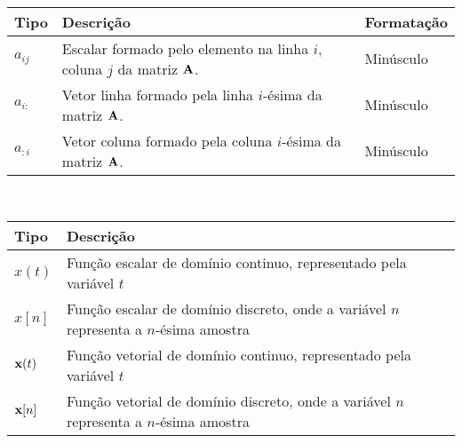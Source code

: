 \begin{notation}~\\
\begin{tabular}{p{} | p{} | p{}}
\hline	
Tipo & Descrição & Formatação \\ \hline
$a_{ij}$ & Escalar formado pelo elemento na linha $i$, coluna $j$ da matriz $\MATRIX{A}$. & Minúsculo \\ \hline
$a_{i:}$ & Vetor linha formado pela linha $i$-ésima da matriz $\MATRIX{A}$.  & Minúsculo \\
$a_{:i}$ & Vetor coluna formado pela coluna $i$-ésima da matriz $\MATRIX{A}$.  & Minúsculo \\
\end{tabular}
\end{notation}


\begin{notation}~\\
\begin{tabular}{p{} | p{} }
\hline	
Tipo            & Descrição \\ \hline
$x(t)$          & Função escalar de domínio continuo, representado pela variável $t$  \\ \hline
$x[n]$          & Função escalar de domínio discreto, onde a variável $n$ representa a $n$-ésima amostra \\ \hline
$\VECTOR{x}(t)$ & Função vetorial de domínio continuo, representado pela variável $t$  \\ \hline
$\VECTOR{x}[n]$ & Função vetorial de domínio discreto, onde a variável $n$ representa a $n$-ésima amostra \\
\end{tabular}
\end{notation}


